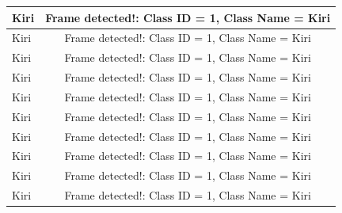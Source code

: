 \begin{longtable}{|l|c|}
  Kiri           & Frame detected!: Class ID = 1, Class Name = Kiri \\ \hline
  Kiri           & Frame detected!: Class ID = 1, Class Name = Kiri \\ \hline
  Kiri           & Frame detected!: Class ID = 1, Class Name = Kiri \\ \hline
  Kiri           & Frame detected!: Class ID = 1, Class Name = Kiri \\ \hline
  Kiri           & Frame detected!: Class ID = 1, Class Name = Kiri \\ \hline
  Kiri           & Frame detected!: Class ID = 1, Class Name = Kiri \\ \hline
  Kiri           & Frame detected!: Class ID = 1, Class Name = Kiri \\ \hline
  Kiri           & Frame detected!: Class ID = 1, Class Name = Kiri \\ \hline
  Kiri           & Frame detected!: Class ID = 1, Class Name = Kiri \\ \hline
  Kiri           & Frame detected!: Class ID = 1, Class Name = Kiri \\ \hline
\end{longtable}

